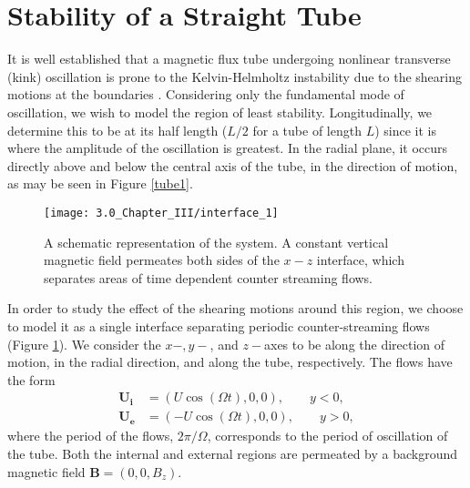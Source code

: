 \documentclass[12pt]{ociamthesis}
\begin{document}

\section{Stability of a Straight Tube}
\label{straight}

It is well established that a magnetic flux tube undergoing nonlinear transverse (kink) oscillation is prone to the Kelvin-Helmholtz instability due to the shearing motions at the boundaries \citep{Terradas2008}.
Considering only the fundamental mode of oscillation, we wish to model the region of least stability.
Longitudinally, we determine this to be at its half length ($L/2$ for a tube of length $L$) since it is where the amplitude of the oscillation is greatest.
In the radial plane, it occurs directly above and below the central axis of the tube, in the direction of motion, as may be seen in Figure \ref{tube1}.

\begin{figure}[t]
\centering
 \texttt{[image: 3.0\_Chapter\_III/interface\_1]}
 \caption{A schematic representation of the system. A constant vertical magnetic field permeates both sides of the $x-z$ interface, which separates areas of time dependent counter streaming flows.}
 \label{interface1}
\end{figure}

In order to study the effect of the shearing motions around this region, we choose to model it as a single interface separating periodic counter-streaming flows (Figure \ref{interface1}).
We consider the $x-, y-$, and $z-$axes to be along the direction of motion, in the radial direction, and along the tube, respectively.
The flows have the form
\begin{align*}
\mathbf{U_i} & = (U \cos(\Omega t), 0, 0), \qquad y < 0,
\\[0.3cm]
\mathbf{U_e} & = (- U \cos(\Omega t), 0, 0), \qquad y > 0,
\end{align*}
where the period of the flows, $2\pi / \Omega$, corresponds to the period of oscillation of the tube.
Both the internal and external regions are permeated by a background magnetic field $\mathbf{B} = (0, 0, B_z)$.
\end{document}
